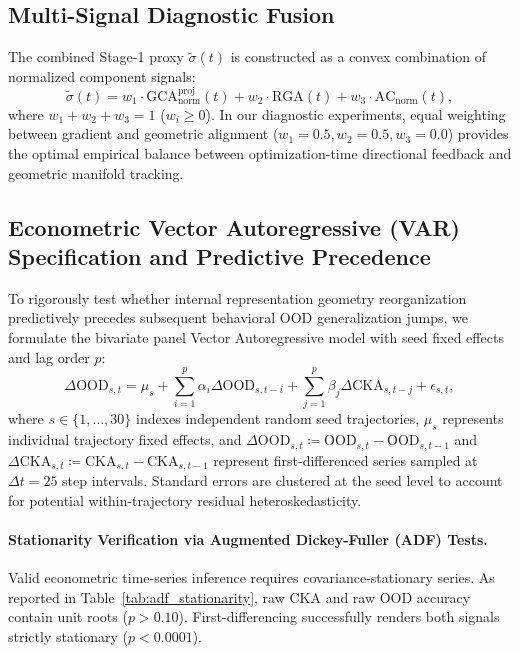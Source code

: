 \documentclass{article}
\theoremstyle{plain}
\theoremstyle{definition}
\begin{document}
\subsection{Multi-Signal Diagnostic Fusion}
The combined Stage-1 proxy $\tilde{\sigma}(t)$ is constructed as a convex combination of normalized component signals:
\begin{equation}
    \tilde{\sigma}(t) = w_1 \cdot \text{GCA}_{\text{norm}}^{\text{proj}}(t) + w_2 \cdot \text{RGA}(t) + w_3 \cdot \text{AC}_{\text{norm}}(t),
    \label{eq:app_proxy_fusion}
\end{equation}
where $w_1 + w_2 + w_3 = 1$ ($w_i \ge 0$). In our diagnostic experiments, equal weighting between gradient and geometric alignment ($w_1 = 0.5, w_2 = 0.5, w_3 = 0.0$) provides the optimal empirical balance between optimization-time directional feedback and geometric manifold tracking.

\subsection{Econometric Vector Autoregressive (VAR) Specification and Predictive Precedence}
To rigorously test whether internal representation geometry reorganization predictively precedes subsequent behavioral OOD generalization jumps, we formulate the bivariate panel Vector Autoregressive model with seed fixed effects and lag order $p$:
\begin{equation}
    \Delta \text{OOD}_{s, t} = \mu_s + \sum_{i=1}^p \alpha_i \Delta \text{OOD}_{s, t-i} + \sum_{j=1}^p \beta_j \Delta \text{CKA}_{s, t-j} + \epsilon_{s, t},
    \label{eq:var_granger}
\end{equation}
where $s \in \{1, \dots, 30\}$ indexes independent random seed trajectories, $\mu_s$ represents individual trajectory fixed effects, and $\Delta \text{OOD}_{s, t} \coloneqq \text{OOD}_{s, t} - \text{OOD}_{s, t-1}$ and $\Delta \text{CKA}_{s, t} \coloneqq \text{CKA}_{s, t} - \text{CKA}_{s, t-1}$ represent first-differenced series sampled at $\Delta t = 25$ step intervals. Standard errors are clustered at the seed level to account for potential within-trajectory residual heteroskedasticity.
\paragraph{Stationarity Verification via Augmented Dickey-Fuller (ADF) Tests.}
Valid econometric time-series inference requires covariance-stationary series. As reported in Table~\ref{tab:adf_stationarity}, raw CKA and raw OOD accuracy contain unit roots ($p > 0.10$). First-differencing successfully renders both signals strictly stationary ($p < 0.0001$).
\end{document}
